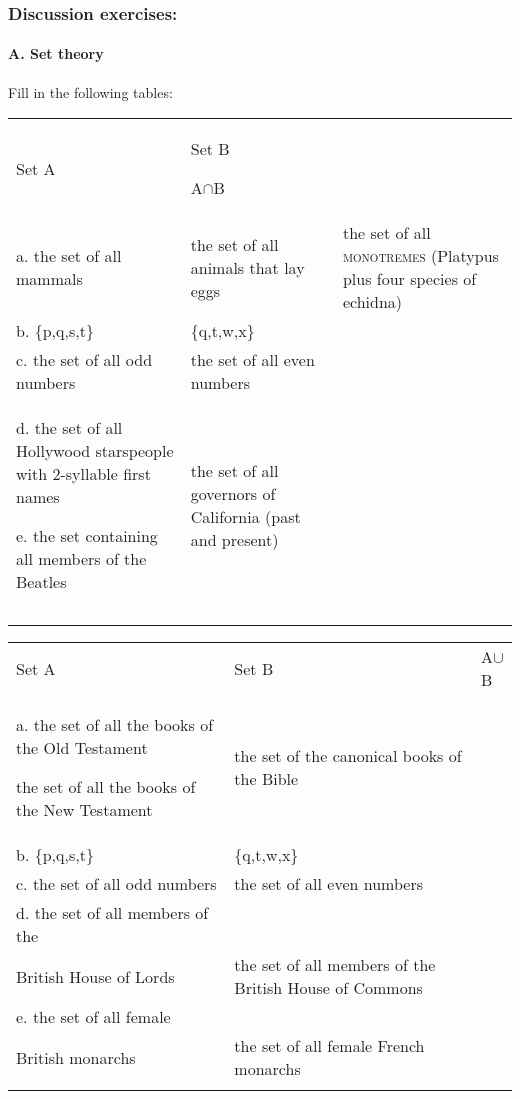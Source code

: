 \subsubsection{Discussion exercises:}\label{sec:}
\paragraph{A. Set theory}

Fill in the following tables:

\ea%
    \label{ex:key:1}




        

\begin{tabularx}{\textwidth}{XXX}
\lsptoprule

 Set A & Set B\par

 A${\cap}$B & \\
a. the set of all mammals & the set of all animals that lay eggs & the set of all \textsc{monotremes} (Platypus plus four species of echidna)\\
b. \{p,q,s,t\} & \{q,t,w,x\} & \\
c. the set of all odd numbers & the set of all even numbers & \\
d. the set of all Hollywood starspeople with 2-syllable first names

e. the set containing all members of the Beatles & the set of all governors of California (past and present) & \\
&  & \\
\lspbottomrule
\end{tabularx}
 \z
 
\ea%
    \label{ex:key:2}




        

\begin{tabularx}{\textwidth}{XXX}
\lsptoprule

 Set A & Set B & A${\cup}$B\\
a. the set of all the books of the Old Testament
   
the set of all the books of the New Testament & the set of the canonical books of the Bible & \\
b. \{p,q,s,t\} & \{q,t,w,x\} & \\
c. the set of all odd numbers & the set of all even numbers & \\
d. the set of all members of the \\
    British House of Lords & the set of all members of the British House of Commons & \\
e. the set of all female\\
    British monarchs & the set of all female French monarchs\footnotemark{} & \\
\lspbottomrule
\end{tabularx}

